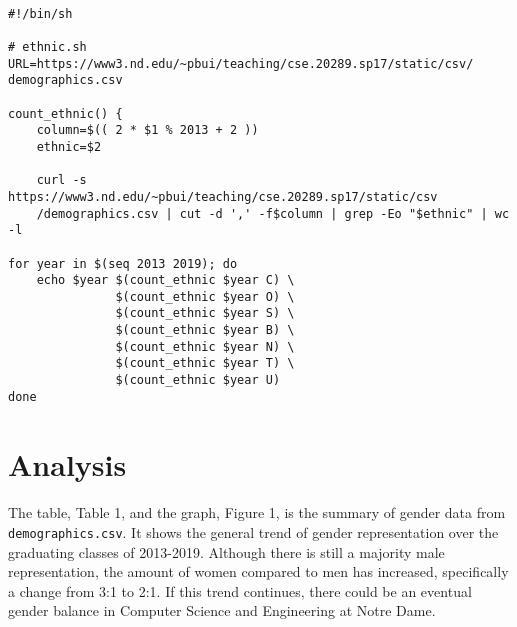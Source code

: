 \documentclass[letterpaper]{article}
\begin{document}
\vspace{5mm}

\begin{lstlisting}[frame=single]

#!/bin/sh                                                           

# ethnic.sh                                                                     
URL=https://www3.nd.edu/~pbui/teaching/cse.20289.sp17/static/csv/
demographics.csv

count_ethnic() {
    column=$(( 2 * $1 % 2013 + 2 ))                                                            
    ethnic=$2                        

    curl -s https://www3.nd.edu/~pbui/teaching/cse.20289.sp17/static/csv
    /demographics.csv | cut -d ',' -f$column | grep -Eo "$ethnic" | wc -l
    
for year in $(seq 2013 2019); do
    echo $year $(count_ethnic $year C) \
               $(count_ethnic $year O) \
               $(count_ethnic $year S) \
               $(count_ethnic $year B) \
               $(count_ethnic $year N) \
               $(count_ethnic $year T) \
               $(count_ethnic $year U)
done

\end{lstlisting}



\section*{Analysis}

\paragraph{}

The table, Table 1,  and the graph, Figure 1, is the summary of gender data from {\tt demographics.csv}. It shows the general trend of gender representation over the graduating classes of 2013-2019. Although there is still a majority male representation, the amount of women compared to men has increased, specifically a change from 3:1 to 2:1. If this trend continues, there could be an eventual gender balance in Computer Science and Engineering at Notre Dame.
\end{document}

